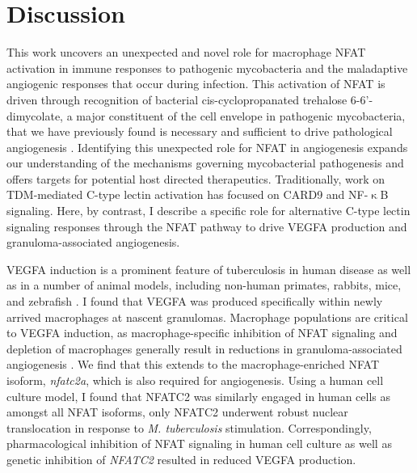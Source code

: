 \section{Discussion}\label{pap:disc}

This work uncovers an unexpected and novel role for macrophage NFAT activation in immune responses to pathogenic mycobacteria and the maladaptive angiogenic responses that occur during infection. This activation of NFAT is driven through recognition of bacterial cis\hyp{}cyclopropanated trehalose 6\hyp{}6'\hyp{}dimycolate, a major constituent of the cell envelope in pathogenic mycobacteria, that we have previously found is necessary and sufficient to drive pathological angiogenesis \citep{Walton2018}. Identifying this unexpected role for NFAT in angiogenesis expands our understanding of the mechanisms governing mycobacterial pathogenesis and offers targets for potential host directed therapeutics. Traditionally, work on TDM\hyp{}mediated C\hyp{}type lectin activation has focused on CARD9 and NF\hyp{}$\upkappa$B signaling. Here, by contrast, I describe a specific role for alternative C\hyp{}type lectin signaling responses through the NFAT pathway to drive VEGFA production and granuloma\hyp{}associated angiogenesis. 

VEGFA induction is a prominent feature of tuberculosis in human disease as well as in a number of animal models, including non\hyp{}human primates, rabbits, mice, and zebrafish \citep{Datta2015, Oehlers2015, Polena2016, Harding2019, Cronan2021, Gideon2022}. I found that VEGFA was produced specifically within newly arrived macrophages at nascent granulomas. Macrophage populations are critical to VEGFA induction, as macrophage\hyp{}specific inhibition of NFAT signaling and depletion of macrophages generally result in reductions in granuloma\hyp{}associated angiogenesis \citep{Oehlers2015}. We find that this extends to the macrophage-enriched NFAT isoform, \textit{nfatc2a}, which is also required for angiogenesis. Using a human cell culture model, I found that NFATC2 was similarly engaged in human cells as amongst all NFAT isoforms, only NFATC2 underwent robust nuclear translocation in response to \textit{M. tuberculosis} stimulation. Correspondingly, pharmacological inhibition of NFAT signaling in human cell culture as well as genetic inhibition of \textit{NFATC2} resulted in reduced VEGFA production.

